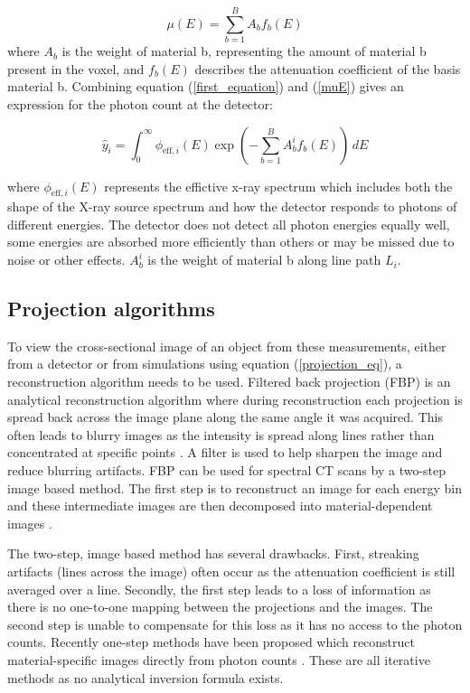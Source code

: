 \documentclass{article}
\begin{document}
\begin{equation}
\label{muE}
\mu(E) = \sum_{b=1}^{B} A_b f_b(E)
\end{equation}
where $A_b$ is the weight of material b, representing the amount of material b present in the voxel, and $f_b(E)$ describes the attenuation coefficient of the basis material b. Combining equation (\ref{first_equation}) and (\ref{muE}) gives an expression for the photon count at the detector:

\begin{equation}
\hat{y}_i = \int_0^{\infty} \phi_{\text{eff},i}(E) \exp\left( - \sum_{b=1}^{B} A_b^i f_b(E) \right) \, dE
\end{equation}

where $\phi_{\text{eff},i}(E)$ represents the effictive x-ray spectrum which includes both the shape of the X-ray source spectrum and how the detector responds to photons of different energies. The detector does not detect all photon energies equally well, some energies are absorbed more efficiently than others or may be missed due to noise or other effects. $A_b^i$ is the weight of material b along line path $L_i$.

\subsection{Projection algorithms}

To view the cross-sectional image of an object from these measurements, either from a detector or from simulations using equation (\ref{projection_eq}), a reconstruction algorithm needs to be used. Filtered back projection (FBP) is an analytical reconstruction algorithm where during reconstruction each projection is spread back across the image plane along the same angle it was acquired. This often leads to blurry images as the intensity is spread along lines rather than concentrated at specific points \citep{zeng2001image}. A filter is used to help sharpen the image and reduce blurring artifacts. FBP can be used for spectral CT scans by a two-step image based method. The first step is to reconstruct an image for each energy bin and these intermediate images are then decomposed into material-dependent images \citep{mory2018comparison}.

The two-step, image based method has several drawbacks. First, streaking artifacts (lines across the image) often occur as the attenuation coefficient is still averaged over a line. Secondly, the first step leads to a loss of information as there is no one-to-one mapping between the projections and the images. The second step is unable to compensate for this loss as it has no access to the photon counts. Recently one-step methods have been proposed which reconstruct material-specific images directly from photon counts \citep{mechlem2018joint}. These are all iterative methods as no analytical inversion formula exists.
\end{document}
